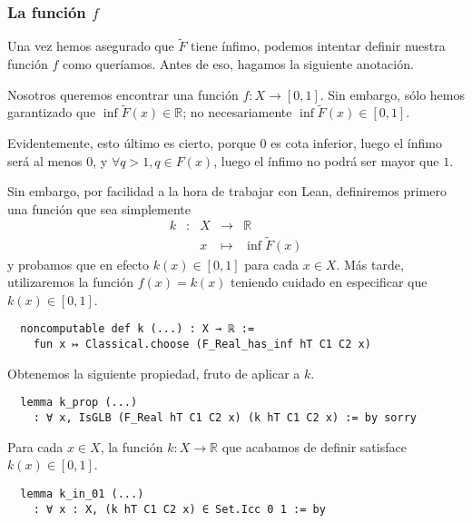 \subsubsection{La función $f$}

Una vez hemos asegurado que $\tilde{F}$ tiene ínfimo, podemos intentar definir nuestra función $f$ como queríamos. Antes de eso, hagamos la siguiente anotación.

Nosotros queremos encontrar una función $f : X \to [0, 1]$. Sin embargo, sólo hemos garantizado que $\inf \tilde{F}(x) \in \mathbb{R}$; no necesariamente $\inf \tilde{F}(x) \in [0, 1]$.

Evidentemente, esto último es cierto, porque $0$ es cota inferior, luego el ínfimo será al menos $0$, y $\forall q>1, q \in F(x)$, luego el ínfimo no podrá ser mayor que $1$.

Sin embargo, por facilidad a la hora de trabajar con Lean, definiremos primero una función que sea simplemente
$$
\begin{array}{rcrcl}
  k & : & X & \longrightarrow & \mathbb{R} \\
    & & x & \longmapsto & \inf \tilde{F}(x)
\end{array}
$$
y probamos que en efecto $k(x) \in [0, 1]$ para cada $x\in X$. Más tarde, utilizaremos la función $f(x) = k(x)$ teniendo cuidado en especificar que $k(x) \in [0, 1]$.

\begin{lstlisting}
  noncomputable def k (...) : X → ℝ :=
    fun x ↦ Classical.choose (F_Real_has_inf hT C1 C2 x)
\end{lstlisting}

Obtenemos la siguiente propiedad, fruto de aplicar  a $k$.

\begin{lstlisting}
  lemma k_prop (...)
    : ∀ x, IsGLB (F_Real hT C1 C2 x) (k hT C1 C2 x) := by sorry
\end{lstlisting}

\begin{lemma}
  Para cada $x \in X$, la función $k : X \to \mathbb{R}$ que acabamos de definir satisface $k(x) \in [0, 1]$.
\end{lemma}

\begin{lstlisting}
  lemma k_in_01 (...)
    : ∀ x : X, (k hT C1 C2 x) ∈ Set.Icc 0 1 := by
\end{lstlisting}

